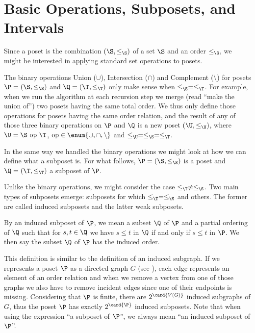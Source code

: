 \section{Basic Operations, Subposets, and Intervals}
\label{tree:poset:sub}


Since a poset is the combination $(\S, \le_{\S})$ of a set $\S$ and an order
$\le_{\S}$, we might be interested in applying standard set operations to posets.

The binary operations Union ($\cup$), Intersection ($\cap$) and Complement
($\setminus$) for posets $\P = (\S, \le_{\S})$ and $\Q = (\T, \le_{\T})$ only make sense
when $\le_{\S} = \le_{\T}$. For example, when we run the algorithm \mergesort at each
recursion step we merge (read ``make the union of'') two posets having the same
total order. We thus only define those operations for posets having the same
order relation, and the result of any of those three binary operations on $\P$
and $\Q$ is a new poset $(\U, \le_{\U})$, where $\U = \S~\text{op}~\T$,
\(\text{op} \in \enum{\cup,\cap,\setminus}\) and $\le_{\U} =
\le_{\S} = \le_{\T}$.


In the same way we handled the binary operations we might look at how we can
define what a subposet is. For what follows, $\P = (\S, \le_{\S})$ is a poset
and $\Q = (\T, \le_{\T})$ a subposet of $\P$.

Unlike the binary operations, we might consider the case $\le_{\T} \neq
\le_{\S}$. Two main types of subposets emerge: subposets for which $\le_{\T} =
\le_{\S}$ and others. The former are called induced subposets and the latter
weak subposets.
\begin{definition}
By an induced subposet of $\P$, we mean a subset $\Q$ of $\P$ and a partial
ordering of $\Q$ such that for $s, t \in \Q$ we have $s \leq t$ in $\Q$ if and
only if $s \leq t$ in $\P$. We then say the subset $\Q$ of $\P$ has the induced
order.
\end{definition}

This definition is similar to the definition of an induced subgraph. If we
represents a poset $\P$ as a directed graph $G$ (see
), each edge represents an element of an order relation
and when we remove a vertex from one of those graphs we also have to remove
incident edges since one of their endpoints is missing. Considering that $\P$ is
finite, there are $2^{\card{V(G)}}$ induced subgraphs of $G$, thus the poset $\P$ has
exactly $2^{\card{\P}}$ induced subposets. Note that when using the expression
``a subposet of $\P$'', we always mean ``an induced subposet of $\P$''.

